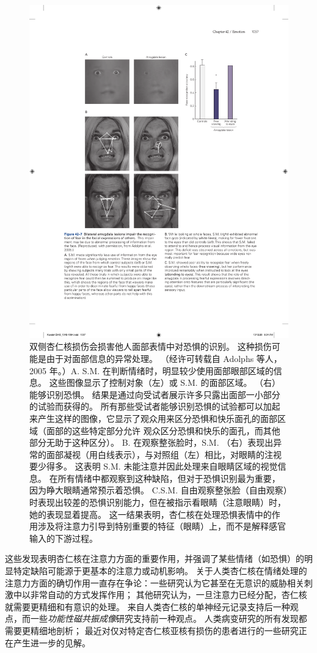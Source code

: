 \begin{figure}[htbp]
	\centering
	\includegraphics[width=0.75\linewidth]{chap42/fig_42_7}
	\caption{双侧杏仁核损伤会损害他人面部表情中对恐惧的识别。 这种损伤可能是由于对面部信息的异常处理。 （经许可转载自 Adolphs 等人，2005 年。）A. S.M. 在判断情绪时，明显较少使用面部眼部区域的信息。 这些图像显示了控制对象（左）或 S.M. 的面部区域。 （右）能够识别恐惧。 结果是通过向受试者展示许多只露出面部一小部分的试验而获得的。 所有那些受试者能够识别恐惧的试验都可以加起来产生这样的图像，它显示了观众用来区分恐惧和快乐面孔的面部区域（面部的这些特定部分允许 观众区分恐惧和快乐的面孔，而其他部分无助于这种区分）。 B. 在观察整张脸时，S.M. （右）表现出异常的面部凝视（用白线表示），与对照组（左）相比，对眼睛的注视要少得多。 这表明 S.M. 未能注意并因此处理来自眼睛区域的视觉信息。 在所有情绪中都观察到这种缺陷，但对于恐惧识别最为重要，因为睁大眼睛通常预示着恐惧。 C.S.M. 自由观察整张脸（自由观察）时表现出较差的恐惧识别能力，但在被指示看眼睛（注意眼睛）时，她的表现显着提高。 这一结果表明，杏仁核在处理恐惧表情中的作用涉及将注意力引导到特别重要的特征（眼睛）上，而不是解释感官输入的下游过程。}
	\label{fig:42_7}
\end{figure}


这些发现表明杏仁核在注意力方面的重要作用，并强调了某些情绪（如恐惧）的明显特定缺陷可能源于更基本的注意力或动机影响。
关于人类杏仁核在情绪处理的注意力方面的确切作用一直存在争论：一些研究认为它甚至在无意识的威胁相关刺激中以非常自动的方式发挥作用；
其他研究认为，一旦注意力已经分配，杏仁核就需要更精细和有意识的处理。
来自人类杏仁核的单神经元记录支持后一种观点，而一些\textit{功能性磁共振成像}研究支持前一种观点。
人类病变研究的所有发现都需要更精细地剖析；
最近对仅对特定杏仁核亚核有损伤的患者进行的一些研究正在产生进一步的见解。



